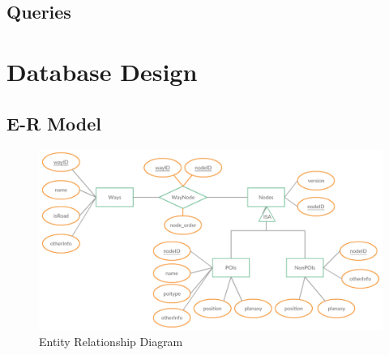 \documentclass[final,1p,times]{elsarticle}
\begin{document}
\subsection{Queries}

\section{Database Design}

\subsection{E-R Model}
\begin{figure}[thpb]
      \centering
      \includegraphics[width=14cm]{ER.pdf}
      \caption{Entity Relationship Diagram}
      \label{fig:ER}
\end{figure}
\end{document}
